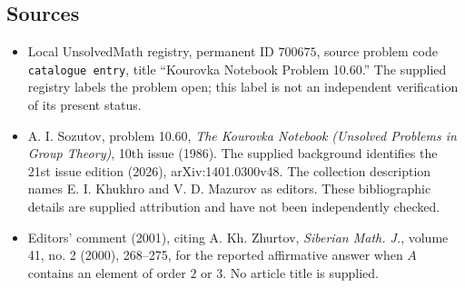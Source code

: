 \documentclass[11pt]{article}
\begin{document}
\subsection{Sources}
\begin{itemize}
\item Local UnsolvedMath registry, permanent ID \(700675\), source problem code \texttt{catalogue entry}, title ``Kourovka Notebook Problem 10.60.'' The supplied registry labels the problem open; this label is not an independent verification of its present status.
\item A. I. Sozutov, problem 10.60, \emph{The Kourovka Notebook (Unsolved Problems in Group Theory)}, 10th issue (1986). The supplied background identifies the 21st issue edition (2026), arXiv:1401.0300v48. The collection description names E. I. Khukhro and V. D. Mazurov as editors. These bibliographic details are supplied attribution and have not been independently checked.
\item Editors' comment (2001), citing A. Kh. Zhurtov, \emph{Siberian Math. J.}, volume 41, no. 2 (2000), 268--275, for the reported affirmative answer when \(A\) contains an element of order \(2\) or \(3\). No article title is supplied.
\end{itemize}
\end{document}
